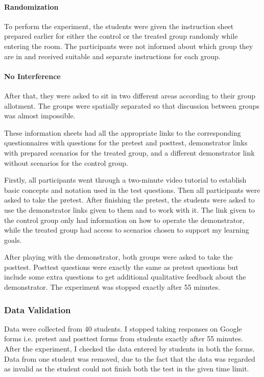 \paragraph{Randomization} To perform the experiment, the students were given the instruction sheet prepared earlier for either the control or the treated group randomly while entering the room. The participants were not informed about which group they are in and received suitable and separate instructions for each group.

\paragraph{No Interference} After that, they were asked to sit in two different areas according to their group allotment. The groups were spatially separated so that discussion between groups was almost impossible.

These information sheets had all the appropriate links to the corresponding questionnaires with questions for the pretest and posttest, demonstrator links with prepared scenarios for the treated group, and a different demonstrator link without scenarios for the control group.

Firstly, all participants went through a two-minute video tutorial to establish basic concepts and notation used in the test questions. Then all participants were asked to take the pretest. After finishing the pretest, the students were asked to use the demonstrator links given to them and to work with it. The link given to the control group only had information on how to operate the demonstrator, while the treated group had access to scenarios chosen to support my learning goals. 

After playing with the demonstrator, both groups were asked to take the posttest. Posttest questions were exactly the same as pretest questions but include some extra questions to get additional qualitative feedback about the demonstrator. The experiment was stopped exactly after 55 minutes.

\subsubsection{Data Validation}\label{subsubsec:datavalidation}
Data were collected from 40 students. I stopped taking responses on Google forms i.e. pretest and posttest forms from students exactly after 55 minutes. After the experiment, I checked the data entered by students in both the forms. Data from one student was removed, due to the fact that the data was regarded as invalid as the student could not finish both the test in the given time limit.

